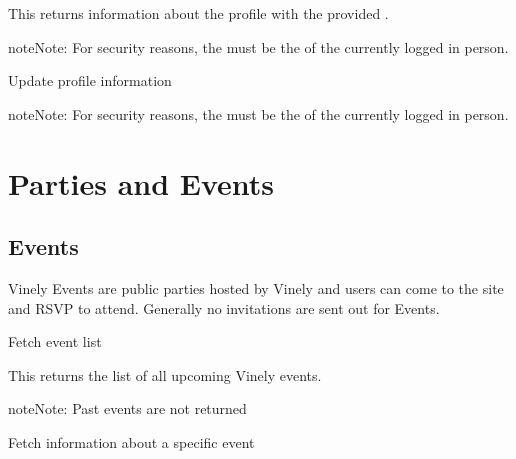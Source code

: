 \documentclass[letterpaper,10pt,english]{sphinxmanual}
\begin{document}
This returns information about the profile with the provided .

\begin{notice}{note}{Note:}
For security reasons, the  must be the  of the currently logged in person.
\end{notice}

Update profile information


\begin{fulllineitems}
\label{accounts:put--api-v1-profile-_id_-}
\end{fulllineitems}


\begin{notice}{note}{Note:}
For security reasons, the  must be the  of the currently logged in person.
\end{notice}


\chapter{Parties and Events}
\label{parties:parties-and-events}\label{parties:ref-parties}\label{parties::doc}

\section{Events}
\label{parties:events}
Vinely Events are public parties hosted by Vinely and users can come to the site and RSVP to attend.
Generally no invitations are sent out for Events.

Fetch event list


\begin{fulllineitems}
\label{parties:get--api-v1-event-}
\end{fulllineitems}


This returns the list of all upcoming Vinely events.

\begin{notice}{note}{Note:}
Past events are not returned
\end{notice}

Fetch information about a specific event


\begin{fulllineitems}
\label{parties:get--api-v1-event-_id_-}
\end{fulllineitems}
\end{document}

